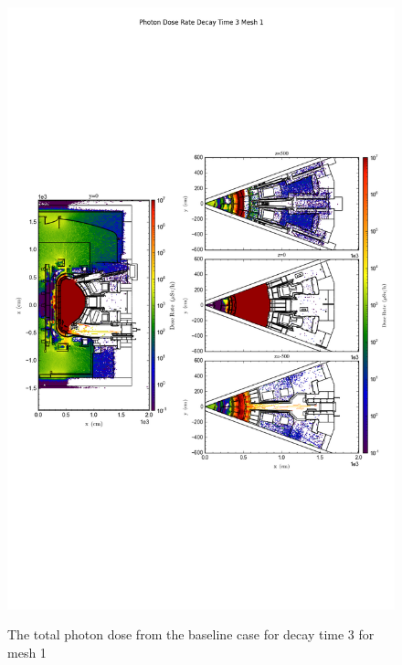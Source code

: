 \begin{figure}[ht!]
\centering
\includegraphics[trim={0cm 9cm 0cm 10cm},clip,scale=0.75]{../plots/final_model/Photon_Dose_Rate_Decay_Time_3_Mesh_1.png}
\label{fig:photons_dc3_no4bc_m1_flux}
\caption{The total photon dose from the baseline case for decay time 3 for mesh 1}
\end{figure}
